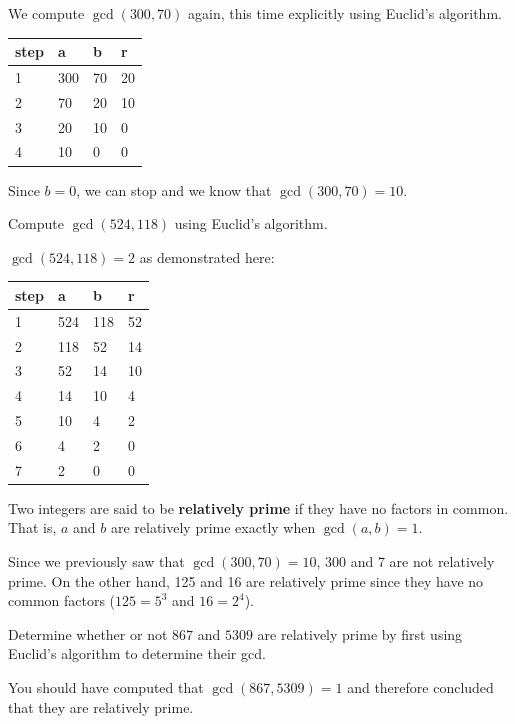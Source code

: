\begin{exa}
We compute $\gcd(300,70)$ again, this time
explicitly using Euclid's algorithm.

\begin{tabular}{|l|l|l|l|}
\hline
step&a&b&r\\
\hline
\hline
1&300&70&20\\
\hline
2&70&20&10\\
\hline
3&20&10&0\\
\hline
4&10&0&0\\
\hline
\end{tabular}

Since $b=0$, we can stop and we know that $\gcd(300,70)=10$.
\end{exa}

\begin{exer}
Compute $\gcd(524,118)$ using Euclid's algorithm.
\vspace*{1.25in}
\begin{answer}
$\gcd(524,118)=2$ as demonstrated here: 

\begin{tabular}{|l|l|l|l|}
\hline
step&a&b&r\\
\hline
\hline
1&524&118&52\\
\hline
2&118&52&14\\
\hline
3&52&14&10\\
\hline
4&14&10&4\\
\hline
5&10&4&2\\
\hline
6&4&2&0\\
\hline
7&2&0&0\\
\hline
\end{tabular}
\end{answer}
\end{exer}

\begin{df}
Two integers are said to be {\bf relatively prime}
if they have no factors in common. That is, $a$ and $b$ are
relatively prime exactly when $\gcd(a,b)=1$.
\end{df}

\begin{exa}
Since we previously saw that $\gcd(300,70)=10$,
300 and 7 are not relatively prime. 
On the other hand, 125 and 16 are relatively prime since they have no common 
factors ($125=5^3$ and $16=2^4$).
\end{exa}

\begin{exer}
Determine whether or not $867$ and $5309$ are relatively prime by
first using Euclid's algorithm to determine their gcd.
\vspace*{1.25in}
\begin{answer}
You should have computed that $\gcd(867,5309)=1$ and therefore
concluded that they are relatively prime.
\end{answer}
\end{exer}


